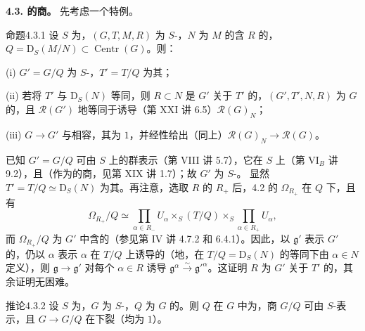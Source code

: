 \textbf{4.3. 的商。} 先考虑一个特例。
\begin{SGAresult}{命题}{4.3.1} 设 $S$ 为，$(G,T,M,R)$ 为 $S$-，$N$ 为 $M$ 的含 $R$ 的，$Q=\mathrm D_S(M/N)\subset\operatorname{Centr}(G)$。则：

(i) $G'=G/Q$ 为 $S$-，$T'=T/Q$ 为其；

(ii) 若将 $T'$ 与 $\mathrm D_S(N)$ 等同，则 $R\subset N$ 是 $G'$ 关于 $T'$ 的，$(G',T',N,R)$ 为 $G$ 的，且 $\mathcal R(G')$ 地等同于诱导（第 XXI 讲 6.5）$\mathcal R(G)_N$；

(iii)  $G\to G'$ 与相容，其为 $1$，并经性给出（同上）$\mathcal R(G)_N\to\mathcal R(G)$。
\end{SGAresult}
已知 $G'=G/Q$ 可由 $S$ 上的群表示（第 VIII 讲 5.7），它在 $S$ 上（第 VI$_B$ 讲 9.2），且（作为的商，见第 XIX 讲 1.7）；故 $G'$ 为 $S$-。
显然 $T'=T/Q\simeq\mathrm D_S(N)$ 为其。再注意，选取 $R$ 的 $R_+$ 后，4.2 的 $\Omega_{R_+}$ 在 $Q$ 下，且有
\[\Omega_{R_+}/Q\simeq\prod_{\alpha\in R_-}U_\alpha\mathbin{\times_S}(T/Q)\mathbin{\times_S}\prod_{\alpha\in R_+}U_\alpha,\]
而 $\Omega_{R_+}/Q$ 为 $G'$ 中含的（参见第 IV 讲 4.7.2 和 6.4.1）。因此，以 $\mathfrak g'$ 表示 $G'$ 的，仍以 $\alpha$ 表示 $\alpha$ 在 $T/Q$ 上诱导的（地，在 $T/Q=\mathrm D_S(N)$ 的等同下由 $\alpha\in N$ 定义），则 $\mathfrak g\to\mathfrak g'$ 对每个 $\alpha\in R$ 诱导 $\mathfrak g^\alpha\xrightarrow\sim\mathfrak g'^\alpha$。这证明 $R$ 为 $G'$ 关于 $T'$ 的，其余证明无困难。
\begin{SGAresult}{推论}{4.3.2} 设 $S$ 为，$G$ 为 $S$-，$Q$ 为 $G$ 的。则 $Q$ 在 $G$ 中为，商 $G/Q$ 可由 $S$-表示，且 $G\to G/Q$ 在下裂（均为 $1$）。\end{SGAresult}
